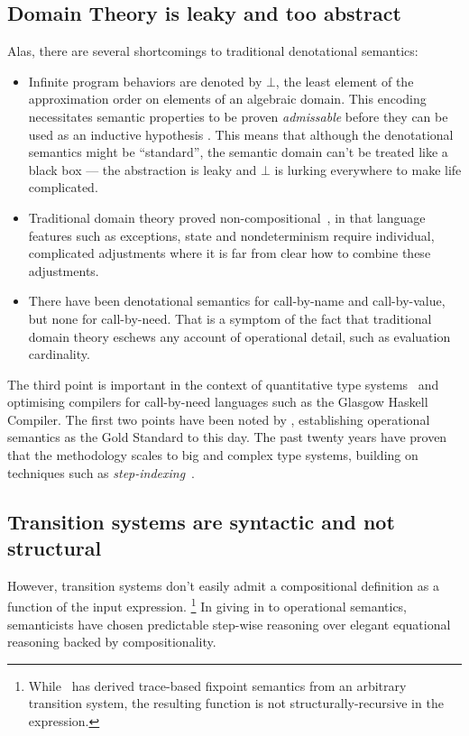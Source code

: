 \subsection{Domain Theory is leaky and too abstract}
Alas, there are several shortcomings to traditional denotational semantics:
\begin{itemize}
  \item Infinite program behaviors are denoted by $\bot$, the least element of
        the approximation order on elements of an algebraic domain.
        This encoding necessitates semantic properties to be proven
        \emph{admissable} before they can be used as an inductive hypothesis
        \citep{Abramsky:94}.
        This means that although the denotational semantics might be
        ``standard'', the semantic domain can't be treated like a black box ---
        the abstraction is leaky and $\bot$ is lurking everywhere to make life
        complicated.
  \item Traditional domain theory proved non-compositional~\citep{WrightFelleisen:94},
        in that language features such as exceptions, state and nondeterminism
        require individual, complicated adjustments where it is far from clear
        how to combine these adjustments.
  \item There have been denotational semantics for call-by-name and
        call-by-value, but none for call-by-need. That is a symptom of the fact
        that traditional domain theory eschews any account of operational
        detail, such as evaluation cardinality.
\end{itemize}

The third point is important in the context of quantitative type
systems~\citep{Atkey:18} and optimising compilers for call-by-need languages such
as the Glasgow Haskell Compiler.
The first two points have been noted by \citet{WrightFelleisen:94}, establishing
operational semantics as the Gold Standard to this day.
The past twenty years have proven that the methodology scales to
big and complex type systems, building on techniques such as
\emph{step-indexing}~\citep{AppelMcAllester:01,DreyerAhmedBirkedal:11}.

\subsection{Transition systems are syntactic and not structural}
However, transition systems don't easily admit a compositional definition as a
function of the input expression.%
\footnote{While~\citet{Cousot:02} has derived trace-based fixpoint
semantics from an arbitrary transition system, the resulting function is not
structurally-recursive in the expression.}
In giving in to operational semantics, semanticists have chosen predictable
step-wise reasoning over elegant equational reasoning backed by
compositionality.

